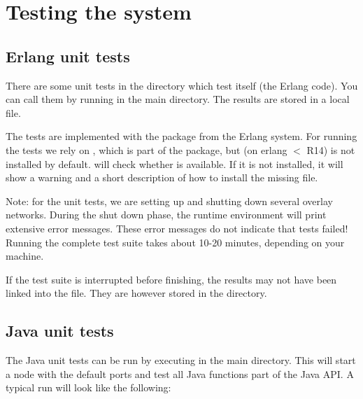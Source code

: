 \chapter{Testing the system}

\section{Erlang unit tests}
There are some unit tests in the  directory which test \scalaris{}
itself (the Erlang code). You can call them
by running  in the main directory. The results are stored
in a local  file. 

The tests are implemented with the  package from the
Erlang system. For running the tests we rely on ,
which is part of the  package, but (on erlang $<$ R14) is not
installed by default.  will check whether  is
available. If it is not installed, it will show a warning and a short
description of how to install the missing file.

Note: for the unit tests, we are setting up and shutting down several
overlay networks. During the shut down phase, the runtime environment
will print extensive error messages. These error messages do not
indicate that tests failed! Running the complete test suite takes
about 10-20 minutes, depending on your machine.

If the test suite is interrupted before finishing, the results may not have
been linked into the  file. They are however stored in the
 directory.

\section{Java unit tests}
The Java unit tests can be run by executing  in the main
directory. This will start a \scalaris{} node with the default ports and test
all Java functions part of the Java API. A typical run will look like the
following:

